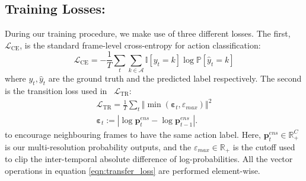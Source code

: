 \documentclass[10pt,twocolumn,letterpaper]{article}
\renewcommand{\epsilon}{\varepsilon}
\newcommand{\calL}{\mathcal{L}}
\newcommand{\calA}{\mathcal{A}}
\newcommand{\bbR}{\mathbb{R}}
\newcommand{\bbI}{\mathbb{I}}
\newcommand{\bp}{\mathbf{p}}
\newcommand{\PP}{\ensuremath{\mathbb{P}}}
\newcommand{\BK}[1]{ {\left( #1 \right)} }
\newcommand{\sqBK}[1]{ {\left[ #1 \right]} }
\newcommand{\norm}[1]{\left\Vert #1 \right\Vert}
\begin{document}
\subsection{Training Losses:}\label{sec:losses}
During our training procedure, we make use of three different losses. 
The first, $\calL_{\text{CE}}$, is the standard frame-level cross-entropy for action classification:
\begin{equation}\label{eqn:cross_entropy}
    \mathcal{L}_{\text{CE}} = - \frac{1}{T} \sum_t \sum_{k\in \calA} \bbI\sqBK{y_t = k} \log \PP\sqBK{\hat{y}_t = k}
\end{equation}
where $y_t, \hat{y}_t$ are the ground truth and the predicted label respectively. The second is the transition loss used in~\cite{farha2019ms, li2020ms} $\mathcal{L}_{\text{TR}}$:
\begin{equation}\label{eqn:transfer_loss}
    \begin{split}
        \mathcal{L}_{\text{TR}}=\frac{1}{T} \sum_{t} \norm{\min\BK{\boldsymbol{\epsilon}_{t}, \epsilon_{max}}}^2 \\
        \boldsymbol{\epsilon}_{t} :=\left|\log \bp^{ens}_t - \log \bp^{ens}_{t-1}\right|.
    \end{split}
\end{equation}
to encourage neighbouring frames to have the same action label. Here,  $\bp^{ens}_t \in \bbR^C_+$ is our multi-resolution probability outputs, and the $\epsilon_{max} \in \bbR_+$ is the cutoff 
used to clip the inter-temporal absolute difference of log-probabilities. All the vector operations in equation \ref{eqn:transfer_loss} are performed element-wise.
\end{document}
